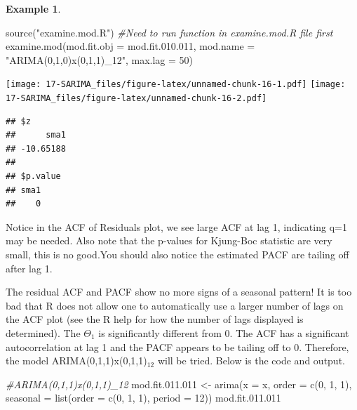 \documentclass[
]{book}
\newenvironment{Shaded}{\begin{snugshade}}{\end{snugshade}}
\newcommand{\AttributeTok}[1]{\textcolor[rgb]{0.77,0.63,0.00}{#1}}
\newcommand{\CommentTok}[1]{\textcolor[rgb]{0.56,0.35,0.01}{\textit{#1}}}
\newcommand{\DecValTok}[1]{\textcolor[rgb]{0.00,0.00,0.81}{#1}}
\newcommand{\FloatTok}[1]{\textcolor[rgb]{0.00,0.00,0.81}{#1}}
\newcommand{\FunctionTok}[1]{\textcolor[rgb]{0.00,0.00,0.00}{#1}}
\newcommand{\NormalTok}[1]{#1}
\newcommand{\OtherTok}[1]{\textcolor[rgb]{0.56,0.35,0.01}{#1}}
\newcommand{\StringTok}[1]{\textcolor[rgb]{0.31,0.60,0.02}{#1}}
\theoremstyle{definition}
\theoremstyle{definition}
\newtheorem{example}{Example}[chapter]
\theoremstyle{definition}
\theoremstyle{definition}
\theoremstyle{remark}
\begin{document}
\begin{example}
\begin{Shaded}
\begin{Highlighting}[]
\FunctionTok{source}\NormalTok{(}\StringTok{"examine.mod.R"}\NormalTok{)}
\CommentTok{\#Need to run function in examine.mod.R file first}
\FunctionTok{examine.mod}\NormalTok{(}\AttributeTok{mod.fit.obj =}\NormalTok{ mod.fit.}\FloatTok{010.011}\NormalTok{, }
    \AttributeTok{mod.name =} \StringTok{"ARIMA(0,1,0)x(0,1,1)\_12"}\NormalTok{, }\AttributeTok{max.lag =} \DecValTok{50}\NormalTok{)}
\end{Highlighting}
\end{Shaded}

\texttt{[image: 17-SARIMA\_files/figure-latex/unnamed-chunk-16-1.pdf]} \texttt{[image: 17-SARIMA\_files/figure-latex/unnamed-chunk-16-2.pdf]}

\begin{verbatim}
## $z
##      sma1 
## -10.65188 
## 
## $p.value
## sma1 
##    0
\end{verbatim}

Notice in the ACF of Residuals plot, we see large ACF at lag 1, indicating q=1 may be needed. Also note that the p-values for Kjung-Boc statistic are very small, this is no good.You should also notice the estimated PACF are tailing off after lag 1.

The residual ACF and PACF show no more signs of a seasonal pattern! It is too bad that R does not allow one to automatically use a larger number of lags on the ACF plot (see the R help for how the number of lags displayed is determined). The \(\Theta_1\) is significantly different from 0. The ACF has a significant autocorrelation at lag 1 and the PACF appears to be tailing off to 0. Therefore, the model ARIMA(0,1,1)x(0,1,1)\(_{12}\) will be tried. Below is the code and output.

\begin{Shaded}
\begin{Highlighting}[]
\CommentTok{\#ARIMA(0,1,1)x(0,1,1)\_12}
\NormalTok{mod.fit.}\FloatTok{011.011} \OtherTok{\textless{}{-}} \FunctionTok{arima}\NormalTok{(}\AttributeTok{x =}\NormalTok{ x, }\AttributeTok{order =} \FunctionTok{c}\NormalTok{(}\DecValTok{0}\NormalTok{, }\DecValTok{1}\NormalTok{, }\DecValTok{1}\NormalTok{), }
      \AttributeTok{seasonal =} \FunctionTok{list}\NormalTok{(}\AttributeTok{order =} \FunctionTok{c}\NormalTok{(}\DecValTok{0}\NormalTok{, }\DecValTok{1}\NormalTok{, }\DecValTok{1}\NormalTok{), }\AttributeTok{period =} \DecValTok{12}\NormalTok{))}
\NormalTok{mod.fit.}\FloatTok{011.011}
\end{Highlighting}
\end{Shaded}


\end{example}
\end{document}
